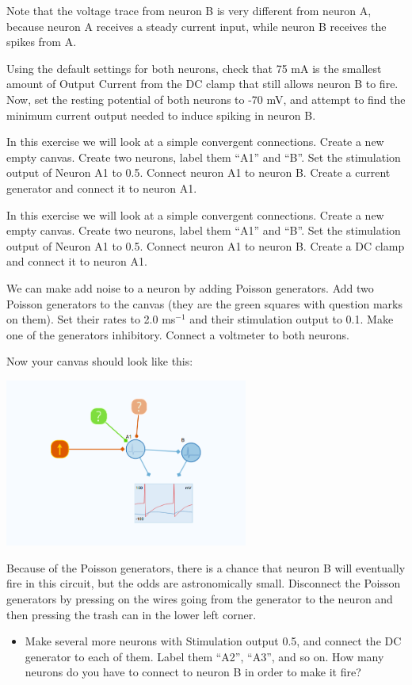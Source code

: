 \begin{Exercise}[title=Small Networks]
\begin{ExePart}
Note that the voltage trace from neuron B is very different from neuron A, because neuron A receives a steady current input, while neuron B receives the spikes from A. 

Using the default settings for both neurons, check that 75 mA is the smallest amount of Output Current from the DC clamp that still allows neuron B to fire. Now, set the resting potential of both neurons to -70 mV, and attempt to find the minimum current output needed to induce spiking in neuron B.
\end{ExePart}

\begin{ExePart}
In this exercise we will look at a simple convergent connections. Create a new empty canvas. Create two neurons, label them ``A1'' and ``B''. Set the stimulation output of Neuron A1 to 0.5. Connect neuron A1 to neuron B. Create a current generator and connect it to neuron A1. 

In this exercise we will look at a simple convergent connections. Create a new empty canvas. Create two neurons, label them ``A1'' and ``B''. Set the stimulation output of Neuron A1 to 0.5. Connect neuron A1 to neuron B. Create a DC clamp and connect it to neuron A1. 


We can make add noise to a neuron by adding Poisson generators. Add two Poisson generators to the canvas (they are the green squares with question marks on them). Set their rates to 2.0 ms$^{-1}$ and their stimulation output to 0.1. Make one of the generators inhibitory. Connect a voltmeter to both neurons. 

Now your canvas should look like this: 
\begin{center}
\includegraphics[width=8cm]{two_neurons_noise.png}
\end{center}

Because of the Poisson generators, there is a chance that neuron B will eventually fire in this circuit, but the odds are astronomically small. Disconnect the Poisson generators by pressing on the wires going from the generator to the neuron and then pressing the trash can in the lower left corner. 
\begin{itemize}
\item Make several more neurons with Stimulation output 0.5, and connect the DC generator to each of them. Label them ``A2'', ``A3'', and so on. How many neurons do you have to connect to neuron B in order to make it fire? 


\end{itemize}
\end{ExePart}
\end{Exercise}
